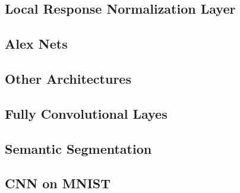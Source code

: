 \documentclass[12pt]{article}
\begin{document}
\subsection{Local Response Normalization Layer}
\label{sec:org337369e}

\subsection{Alex Nets}
\label{sec:orge2f39d0}

\subsection{Other Architectures}
\label{sec:orgff63a2a}

\subsection{Fully Convolutional Layes}
\label{sec:orgcb42720}

\subsection{Semantic Segmentation}
\label{sec:org4dd9881}

\subsection{CNN on MNIST}
\label{sec:org1433ded}

\subsection{}
\label{sec:orgd2bf8ea}
\end{document}
